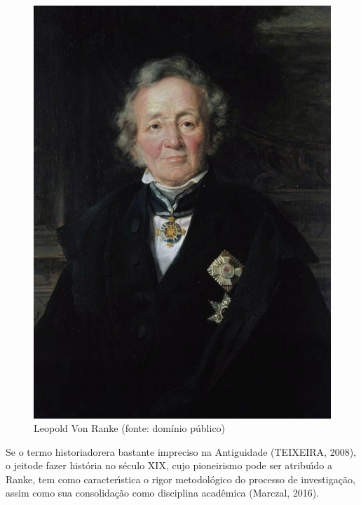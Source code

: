 \documentclass[
12pt,		%
openright,	%
twoside,  %
a4paper,			%
chapter=TITLE,		%
english,			%
french,				%
spanish,			%
brazil				%
]{USPSC-classe/USPSC_RedarTex}
\begin{document}
\captionsetup{format=plain}
\begin{figure}[max size={\textwidth}{\textheight}]

\centering


\begin{minipage}[b]{0.4\linewidth}
        \centering
                \includegraphics[width=1.0\linewidth]{../../imagens/ranke.jpg}
                \caption{Leopold Von Ranke (fonte: dom\'{i}nio p\'ublico)}
                \label{e978df58deaf86ca4da4073fca97b28afd4d3a3b}
\end{minipage}%
\hspace{0.5cm}
\end{figure}



Se o termo \textquotedbl historiador\textquotedbl  era bastante impreciso na Antiguidade (TEIXEIRA, 2008), o \textquotedbl jeito\textquotedbl  de fazer hist\'oria no s\'eculo XIX, cujo pioneirismo pode ser atribu\'{\i}do a Ranke, tem como caracter\'{\i}stica \textquotedbl o rigor metodol\'ogico do processo de investiga\c{c}\~ao\textquotedbl , assim como sua consolida\c{c}\~ao como disciplina acad\^emica (Marczal, 2016).
\end{document}
